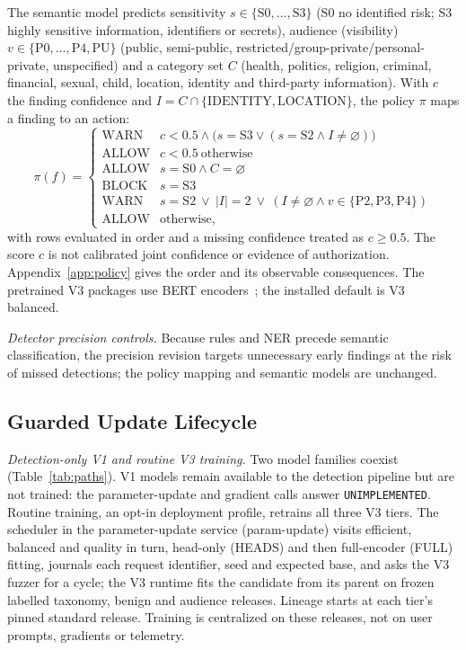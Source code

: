 \documentclass[sigconf]{acmart}
\theoremstyle{acmdefinition}\newtheorem{property}{Property}
\begin{document}
\label{sec:pii_categorisation}
The semantic model predicts sensitivity $s\in\{\mathrm{S0},\dots,\mathrm{S3}\}$ (S0 no identified risk; S3 highly sensitive information, identifiers or secrets), audience (visibility) $v\in\{\mathrm{P0},\dots,\mathrm{P4},\mathrm{PU}\}$ (public, semi-public, restricted/group-private/personal-private, unspecified) and a category set $C$ (health, politics, religion, criminal, financial, sexual, child, location, identity and third-party information). With $c$ the finding confidence and $I=C\cap\{\mathrm{IDENTITY},\mathrm{LOCATION}\}$, the policy $\pi$ maps a finding to an action:
\begin{equation}
\pi(f)=\begin{cases}
\mathrm{WARN} & c<0.5\wedge\bigl(s=\mathrm{S3}\vee(s=\mathrm{S2}\wedge I\neq\varnothing)\bigr)\\
\mathrm{ALLOW} & c<0.5\ \text{otherwise}\\
\mathrm{ALLOW} & s=\mathrm{S0}\wedge C=\varnothing\\
\mathrm{BLOCK} & s=\mathrm{S3}\\
\mathrm{WARN} & s=\mathrm{S2}\ \vee\ |I|=2\ \vee\ (I\neq\varnothing\wedge v\in\{\mathrm{P2},\mathrm{P3},\mathrm{P4}\})\\
\mathrm{ALLOW} & \text{otherwise,}
\end{cases}
\end{equation}
with rows evaluated in order and a missing confidence treated as $c\ge0.5$. The score $c$ is not calibrated joint confidence or evidence of authorization. Appendix~\ref{app:policy} gives the order and its observable consequences. The pretrained V3 packages use BERT encoders~\cite{turc2019WellReadStudents}; the installed default is V3 balanced.

\label{sec:detector_precision_design}
\textit{Detector precision controls.} Because rules and NER precede semantic classification, the precision revision targets unnecessary early findings at the risk of missed detections; the policy mapping and semantic models are unchanged.

\subsection{Guarded Update Lifecycle}
\label{sec:updates}
\textit{Detection-only V1 and routine V3 training.} Two model families coexist (Table~\ref{tab:paths}). V1 models remain available to the detection pipeline but are not trained: the parameter-update and gradient calls answer \texttt{UNIMPLEMENTED}. Routine training, an opt-in deployment profile, retrains all three V3 tiers. The scheduler in the parameter-update service (param-update) visits efficient, balanced and quality in turn, head-only (HEADS) and then full-encoder (FULL) fitting, journals each request identifier, seed and expected base, and asks the V3 fuzzer for a cycle; the V3 runtime fits the candidate from its parent on frozen labelled taxonomy, benign and audience releases. Lineage starts at each tier's pinned standard release. Training is centralized on these releases, not on user prompts, gradients or telemetry.
\end{document}
